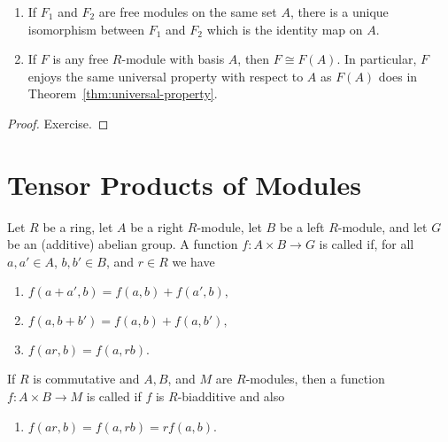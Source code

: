     \begin{corollary}
        \phantom{a}
        \begin{enumerate}[label=(\arabic*)]
            \item If $F_1$ and $F_2$ are free modules on the same set $A$, there is a unique isomorphism between $F_1$ and $F_2$ which is the identity map on $A$.
            \item If $F$ is any free $R$-module with basis $A$, then $F \cong F(A)$. In particular, $F$ enjoys the same universal property with respect to $A$ as $F(A)$ does in Theorem~\ref{thm:universal-property}.
        \end{enumerate}
    \end{corollary}
    \begin{proof}
        Exercise.
    \end{proof}

\section{Tensor Products of Modules}
    \begin{definition}\label{def:biadditive-bilinear}
        Let $R$ be a ring, let $A$ be a right $R$-module, let $B$ be a left $R$-module, and let $G$ be an (additive) abelian group. A function $f:A\times B \rightarrow G$ is called  if, for all $a,a' \in A$, $b,b' \in B$, and $r \in R$ we have
            \begin{enumerate}[label=(\arabic*)]
                \item $f(a+a',b) = f(a,b) + f(a',b),$
                \item $f(a,b+b') = f(a,b) + f(a,b'),$
                \item $f(ar,b) = f(a,rb).$
            \end{enumerate}
        If $R$ is commutative and $A,B$, and $M$ are $R$-modules, then a function $f:A\times B \rightarrow M$ is called  if $f$ is $R$-biadditive and also 
            \begin{enumerate}[label=(\arabic*)]
                \addtocounter{enumi}{3}
                \item $f(ar,b) = f(a,rb) = rf(a,b)$.
            \end{enumerate}
    \end{definition}

